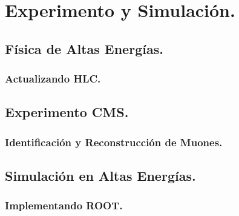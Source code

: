 \documentclass[12pt]{report}
\begin{document}
		
				


\chapter{Experimento y Simulación.}

		
	\section{Física de Altas Energías.}
	
		
		\subsection{Actualizando HLC.}	
		
	
	\section{Experimento CMS.}
	
	
	
		\subsection{Identificación y Reconstrucción de Muones.}
		
		
	\section{Simulación en Altas Energías.}
	
	
		\subsection{Implementando ROOT.}\label{C_root}
		
		
		
\end{document}
